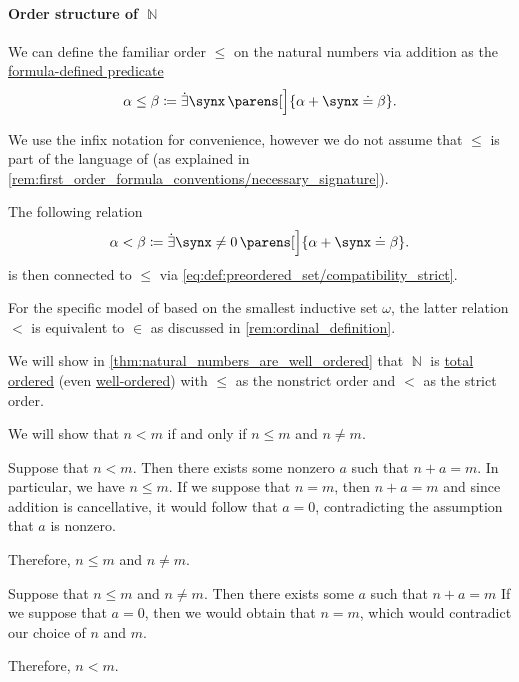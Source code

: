 \paragraph{Order structure of \( \BbbN \)}

\begin{definition}\label{def:natural_numbers_ordering}
  We can define the familiar order \( \leq \) on the natural numbers via addition as the \hyperref[con:formula_defined_predicate]{formula-defined predicate}
  \begin{equation}\label{eq:def:natural_numbers_ordering/predicate}
    \alpha \leq \beta \coloneqq \qexists \synx \parens[\Big]{ \alpha + \synx \syneq \beta }.
  \end{equation}

  We use the infix notation for convenience, however we do not assume that \( \leq \) is part of the language of  (as explained in \cref{rem:first_order_formula_conventions/necessary_signature}).

  The following relation
  \begin{equation}\label{eq:def:natural_numbers_ordering/strict_predicate}
    \alpha < \beta \coloneqq \qexists {\synx \neq 0} \parens[\Big]{ \alpha + \synx \syneq \beta }.
  \end{equation}
  is then connected to \( \leq \) via \eqref{eq:def:preordered_set/compatibility_strict}.
\end{definition}
\begin{comments}
  \item For the specific model of  based on the smallest inductive set \( \omega \), the latter relation \( < \) is equivalent to \( \in \) as discussed in \cref{rem:ordinal_definition}.
  \item We will show in \cref{thm:natural_numbers_are_well_ordered} that \( \BbbN \) is \hyperref[def:totally_ordered_set]{total ordered} (even \hyperref[def:well_ordered_set]{well-ordered}) with \( \leq \) as the nonstrict order and \( < \) as the strict order.
\end{comments}
\begin{defproof}
  We will show that \( n < m \) if and only if \( n \leq m \) and \( n \neq m \).

  \SufficiencySubProof Suppose that \( n < m \). Then there exists some nonzero \( a \) such that \( n + a = m \). In particular, we have \( n \leq m \). If we suppose that \( n = m \), then \( n + a = m \) and since addition is cancellative, it would follow that \( a = 0 \), contradicting the assumption that \( a \) is nonzero.

  Therefore, \( n \leq m \) and \( n \neq m \).

  \NecessitySubProof Suppose that \( n \leq m \) and \( n \neq m \). Then there exists some \( a \) such that \( n + a = m \) If we suppose that \( a = 0 \), then we would obtain that \( n = m \), which would contradict our choice of \( n \) and \( m \).

  Therefore, \( n < m \).
\end{defproof}

